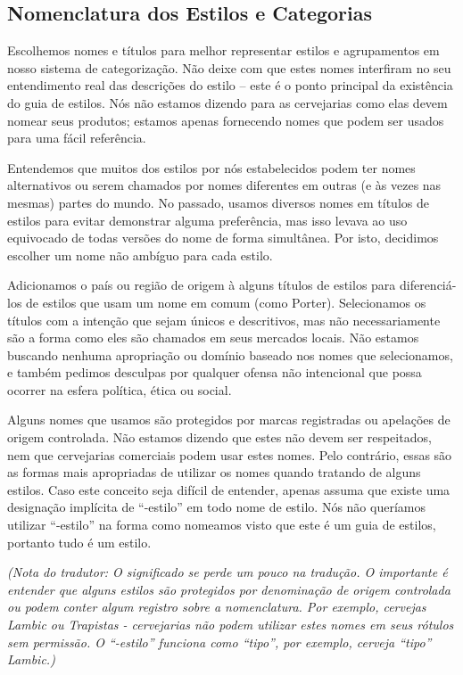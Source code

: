 \subsection*{Nomenclatura dos Estilos e Categorias}

Escolhemos nomes e títulos para melhor representar estilos e agrupamentos em nosso sistema de categorização. Não deixe com que estes nomes interfiram no seu entendimento real das descrições do estilo – este é o ponto principal da existência do guia de estilos. Nós não estamos dizendo para as cervejarias como elas devem nomear seus produtos; estamos apenas fornecendo nomes que podem ser usados para uma fácil referência.

Entendemos que muitos dos estilos por nós estabelecidos podem ter nomes alternativos ou serem chamados por nomes diferentes em outras (e às vezes nas mesmas) partes do mundo. No passado, usamos diversos nomes em títulos de estilos para evitar demonstrar alguma preferência, mas isso levava ao uso equivocado de todas versões do nome de forma simultânea. Por isto, decidimos escolher um nome não ambíguo para cada estilo.

Adicionamos o país ou região de origem à alguns títulos de estilos para diferenciá-los de estilos que usam um nome em comum (como Porter). Selecionamos os títulos com a intenção que sejam únicos e descritivos, mas não necessariamente são a forma como eles são chamados em seus mercados locais. Não estamos buscando nenhuma apropriação ou domínio baseado nos nomes que selecionamos, e também pedimos desculpas por qualquer ofensa não intencional que possa ocorrer na esfera política, ética ou social.

Alguns nomes que usamos são protegidos por marcas registradas ou apelações de origem controlada. Não estamos dizendo que estes não devem ser respeitados, nem que cervejarias comerciais podem usar estes nomes. Pelo contrário, essas são as formas mais apropriadas de utilizar os nomes quando tratando de alguns estilos. Caso este conceito seja difícil de entender, apenas assuma que existe uma designação implícita de “-estilo” em todo nome de estilo. Nós não queríamos utilizar “-estilo” na forma como nomeamos visto que este é um guia de estilos, portanto tudo é um estilo.

\textit{(Nota do tradutor: O significado se perde um pouco na tradução. O importante é entender que alguns estilos são protegidos por denominação de origem controlada ou podem conter algum registro sobre a nomenclatura. Por exemplo, cervejas Lambic ou Trapistas -  cervejarias não podem utilizar estes nomes em seus rótulos sem permissão. O “-estilo” funciona como “tipo”, por exemplo, cerveja “tipo” Lambic.)}
